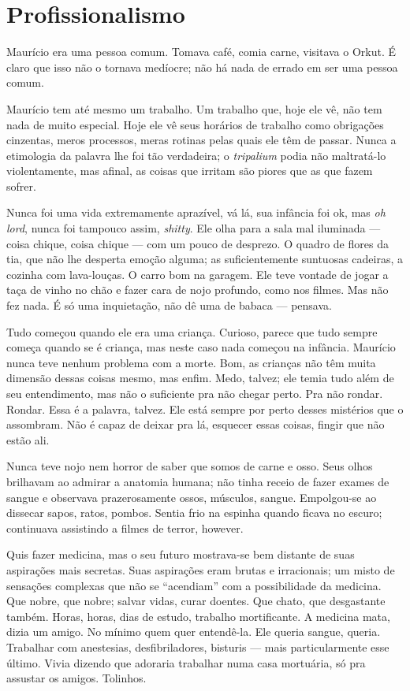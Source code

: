\chapter{Profissionalismo}

Maurício era uma pessoa comum. Tomava café, comia carne, visitava o Orkut. É claro que isso não o tornava medíocre; não há nada de errado em ser uma pessoa comum.

Maurício tem até mesmo um trabalho. Um trabalho que, hoje ele vê, não tem nada de muito especial. Hoje ele vê seus horários de trabalho como obrigações cinzentas, meros processos, meras rotinas pelas quais ele têm de passar. Nunca a etimologia da palavra lhe foi tão verdadeira; o \emph{tripalium} podia não maltratá-lo violentamente, mas afinal, as coisas que irritam são piores que as que fazem sofrer.

Nunca foi uma vida extremamente aprazível, vá lá, sua infância foi ok, mas \emph{oh lord}, nunca foi tampouco assim, \foreignlanguage{english}{\emph{shitty}}. Ele olha para a sala mal iluminada --- coisa chique, coisa chique --- com um pouco de desprezo. O quadro de flores da tia, que não lhe desperta emoção alguma; as suficientemente suntuosas cadeiras, a cozinha com lava-louças. O carro bom na garagem. Ele teve vontade de jogar a taça de vinho no chão e fazer cara de nojo profundo, como nos filmes. Mas não fez nada. É só uma inquietação, não dê uma de babaca --- pensava.

Tudo começou quando ele era uma criança. Curioso, pa\-re\-ce que tudo sempre começa quando se é criança, mas neste caso nada começou na infância. Maurício nunca teve nenhum problema com a morte. Bom, as crianças não têm muita dimensão dessas coisas mesmo, mas enfim. Medo, talvez; ele temia tudo além de seu entendimento, mas não o suficiente pra não chegar perto. Pra não rondar. Rondar. Essa é a palavra, talvez. Ele está sempre por perto desses mistérios que o assombram. Não é capaz de deixar pra lá, esquecer essas coisas, fingir que não estão ali.

Nunca teve nojo nem horror de saber que somos de carne e osso. Seus olhos brilhavam ao admirar a anatomia humana; não tinha receio de fazer exames de sangue e observava prazerosamente ossos, músculos, sangue. Empolgou-se ao dissecar sapos, ratos, pombos. Sentia frio na espinha quando ficava no escuro; continuava assistindo a filmes de terror, however.

Quis fazer medicina, mas o seu futuro mostrava-se bem distante de suas aspirações mais secretas. Suas aspirações eram brutas e irracionais; um misto de sensações complexas que não se ``acendiam'' com a possibilidade da medicina. Que nobre, que nobre; salvar vidas, curar doentes. Que chato, que desgastante também. Horas, horas, dias de estudo, trabalho mortificante. A medicina mata, dizia um amigo. No mínimo quem quer entendê-la. Ele queria sangue, queria. Trabalhar com anestesias, desfibriladores, bisturis --- mais particularmente esse último. Vivia dizendo que adoraria trabalhar numa casa mortuária, só pra assustar os amigos. Tolinhos.

